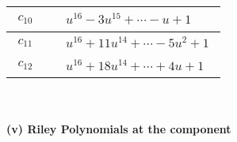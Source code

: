 \documentclass[1p]{elsarticle_modified}
\theoremstyle{definition}
\begin{document}
\begin{tabular}{m{50pt}|m{274pt}}
\hline $$\begin{aligned}c_{10}\end{aligned}$$&$\begin{aligned}
&u^{16}-3 u^{15}+\cdots- u+1
\end{aligned}$\\
\hline $$\begin{aligned}c_{11}\end{aligned}$$&$\begin{aligned}
&u^{16}+11 u^{14}+\cdots-5 u^2+1
\end{aligned}$\\
\hline $$\begin{aligned}c_{12}\end{aligned}$$&$\begin{aligned}
&u^{16}+18 u^{14}+\cdots+4 u+1
\end{aligned}$\\
\hline
\end{tabular}\\~\\
\newpage\renewcommand{\arraystretch}{1}
\flushleft \textbf{(v) Riley Polynomials at the component}\newline \\
\end{document}
